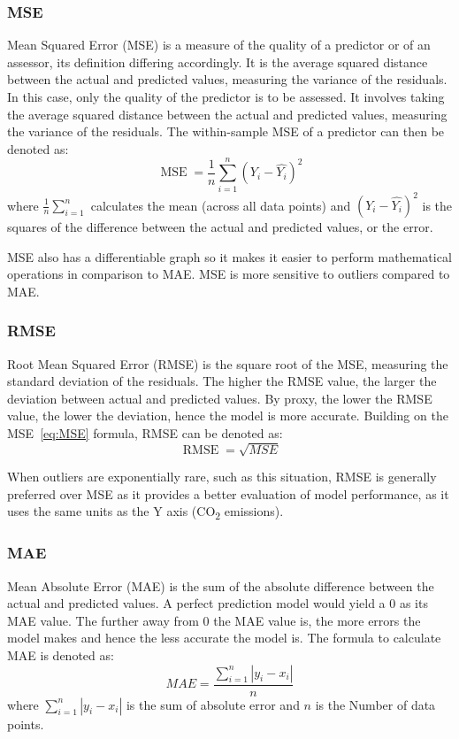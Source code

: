 \documentclass[12pt]{mcmthesis}
\begin{document}
    \subsubsection*{MSE}
    Mean Squared Error (MSE) is a measure of the quality of a predictor or of an assessor, its definition differing accordingly. It is the average squared distance between the actual and predicted values, measuring the variance of the residuals. In this case, only the quality of the predictor is to be assessed. It involves taking the average squared distance between the actual and predicted values, measuring the variance of the residuals. The within-sample MSE of a predictor can then be denoted as:
%
    \begin{equation}
        \operatorname {MSE} ={\frac {1}{n}}\sum _{i=1}^{n}\left(Y_{i}-{\hat {Y_{i}}}\right)^{2}
        \label{eq:MSE}
    \end{equation}
%
    where
    ${\frac {1}{n}\sum _{i=1}^{n}}$ calculates the mean (across all data points) and
    ${\left(Y_{i}-{\hat {Y_{i}}}\right)^{2}}$ is the squares of the difference between the actual and predicted values, or the error.

    MSE also has a differentiable graph so it makes it easier to perform mathematical operations in comparison to MAE. MSE is more sensitive to outliers compared to MAE\@.

    \subsubsection*{RMSE}
    Root Mean Squared Error (RMSE) is the square root of the MSE, measuring the standard deviation of the residuals. The higher the RMSE value, the larger the deviation between actual and predicted values. By proxy, the lower the RMSE value, the lower the deviation, hence the model is more accurate. Building on the MSE~\eqref{eq:MSE} formula, RMSE can be denoted as:
%
    \begin{equation}
        \operatorname {RMSE} = \sqrt{MSE}
    \end{equation}

    When outliers are exponentially rare, such as this situation, RMSE is generally preferred over MSE as it provides a better evaluation of model performance, as it uses the same units as the Y axis (CO\textsubscript{2} emissions).

    \subsubsection*{MAE}
    Mean Absolute Error (MAE) is the sum of the absolute difference between the actual and predicted values. A perfect prediction model would yield a 0 as its MAE value. The further away from 0 the MAE value is, the more errors the model makes and hence the less accurate the model is. The formula to calculate MAE is denoted as:
%
    \begin{equation}
        \displaystyle {MAE} ={\frac {\sum _{i=1}^{n}\left|y_{i}-x_{i}\right|}{n}}
    \end{equation}
%
    where
    ${\sum _{i=1}^{n}\left|y_{i}-x_{i}\right|}$ is the sum of absolute error and
     $n$ is the Number of data points.
\end{document}
